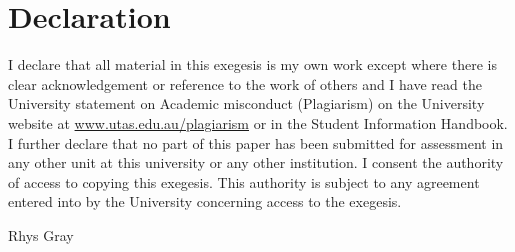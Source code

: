 \cleardoublepage{}
\section[Declaration]{Declaration}
 \noindent I declare that all material in this exegesis is my own work except where there is clear acknowledgement or reference to the work of others and I have read the University statement on Academic misconduct (Plagiarism) on the University website at
\url{www.utas.edu.au/plagiarism} or in the Student Information Handbook. I further declare that no part of this paper has been submitted for assessment in any other unit at this university or any other institution. I consent the authority of access to copying this exegesis. This authority is subject to any agreement entered into by the University concerning access to the exegesis. 

Rhys Gray

\date{\today}

\thispagestyle{empty}
\cleardoublepage{}
